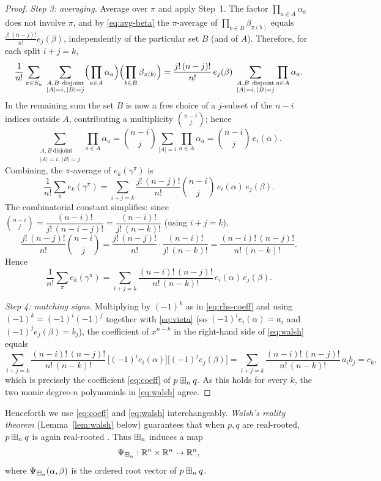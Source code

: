 \begin{proof}
\smallskip\noindent\emph{Step 3: averaging.}
Average over $\pi$ and apply Step~1. The factor $\prod_{a\in A}\alpha_a$ does not
involve $\pi$, and by \eqref{eq:avg-beta} the $\pi$-average of
$\prod_{b\in B}\beta_{\pi(b)}$ equals $\tfrac{j!\,(n-j)!}{n!}e_j(\beta)$,
independently of the particular set $B$ (and of $A$). Therefore, for each split
$i+j=k$,
\[
\frac1{n!}\sum_{\pi\in S_n}\;\sum_{\substack{A,B\ \text{disjoint}\\ |A|=i,\,|B|=j}}
\Bigl(\prod_{a\in A}\alpha_a\Bigr)\Bigl(\prod_{b\in B}\beta_{\pi(b)}\Bigr)
=\frac{j!\,(n-j)!}{n!}\,e_j(\beta)\;
\sum_{\substack{A,B\ \text{disjoint}\\ |A|=i,\,|B|=j}}\prod_{a\in A}\alpha_a .
\]
In the remaining sum the set $B$ is now a free choice of a $j$-subset of the
$n-i$ indices outside $A$, contributing a multiplicity $\binom{n-i}{j}$; hence
\[
\sum_{\substack{A,B\ \text{disjoint}\\ |A|=i,\,|B|=j}}\prod_{a\in A}\alpha_a
=\binom{n-i}{j}\sum_{|A|=i}\prod_{a\in A}\alpha_a
=\binom{n-i}{j}\,e_i(\alpha).
\]
Combining, the $\pi$-average of $e_k(\gamma^\pi)$ is
\[
\frac1{n!}\sum_{\pi}e_k(\gamma^\pi)
=\sum_{i+j=k}\frac{j!\,(n-j)!}{n!}\binom{n-i}{j}\,e_i(\alpha)\,e_j(\beta).
\]
The combinatorial constant simplifies: since
$\binom{n-i}{j}=\dfrac{(n-i)!}{j!\,(n-i-j)!}=\dfrac{(n-i)!}{j!\,(n-k)!}$ (using
$i+j=k$),
\[
\frac{j!\,(n-j)!}{n!}\binom{n-i}{j}
=\frac{j!\,(n-j)!}{n!}\cdot\frac{(n-i)!}{j!\,(n-k)!}
=\frac{(n-i)!\,(n-j)!}{n!\,(n-k)!}.
\]
Hence
\[
\frac1{n!}\sum_{\pi}e_k(\gamma^\pi)
=\sum_{i+j=k}\frac{(n-i)!\,(n-j)!}{n!\,(n-k)!}\,e_i(\alpha)\,e_j(\beta).
\]

\smallskip\noindent\emph{Step 4: matching signs.}
Multiplying by $(-1)^k$ as in \eqref{eq:rhs-coeff} and using $(-1)^k=(-1)^i(-1)^j$
together with \eqref{eq:vieta} (so
$(-1)^i e_i(\alpha)=a_i$ and $(-1)^j e_j(\beta)=b_j$), the coefficient of
$x^{n-k}$ in the right-hand side of \eqref{eq:walsh} equals
\[
\sum_{i+j=k}\frac{(n-i)!\,(n-j)!}{n!\,(n-k)!}\,
\bigl[(-1)^i e_i(\alpha)\bigr]\bigl[(-1)^j e_j(\beta)\bigr]
=\sum_{i+j=k}\frac{(n-i)!\,(n-j)!}{n!\,(n-k)!}\,a_i b_j
= c_k,
\]
which is precisely the coefficient \eqref{eq:coeff} of $p\boxplus_n q$. As this holds
for every $k$, the two monic degree-$n$ polynomials in \eqref{eq:walsh} agree.
\end{proof}

\noindent Henceforth we use \eqref{eq:coeff} and \eqref{eq:walsh}
interchangeably. \emph{Walsh's reality theorem} (Lemma~\ref{lem:walsh} below)
guarantees that when $p,q$ are real-rooted, $p\boxplus_n q$ is again real-rooted
\cite{Walsh, MSS22}. Thus $\boxplus_n$ induces a map
\[
\Psi_{\boxplus_n}:\mathbb{R}^n\times\mathbb{R}^n\to\mathbb{R}^n,
\]
where $\Psi_{\boxplus_n}(\alpha,\beta)$ is the ordered root vector of $p\boxplus_n q$.

